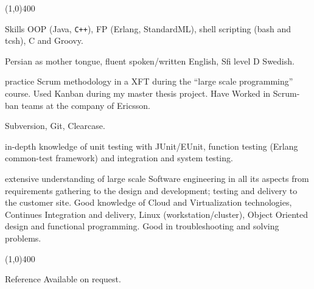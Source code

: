 \documentclass{resume}
\begin{document}
\begin{center}
\line(1,0){400}
\end{center}
\begin{category}{Skills}
\hspace{1 mm}OOP (Java, \texttt{C++}), FP (Erlang, StandardML), 
shell scripting (bash and tcsh), C and Groovy.

\hspace{1 mm}Persian as mother tongue, fluent spoken/written English,
Sfi level D Swedish.

\hspace{1 mm}practice Scrum methodology in a XFT during 
the ``large scale programming'' course. Used Kanban during my master thesis project. 
Have Worked in Scrum-ban teams at the company of Ericsson.

\hspace{1 mm}Subversion, Git, Clearcase. 

\hspace{1 mm}in-depth knowledge of unit 
testing with JUnit/EUnit, function testing (Erlang common-test framework) 
and integration and system testing.

\hspace{1 mm}extensive understanding of large scale 
Software engineering in all its aspects from requirements gathering 
to the design and development; testing and delivery to the customer site. 
Good knowledge of Cloud and Virtualization technologies, Continues Integration and delivery, 
Linux (workstation/cluster), Object Oriented design and functional programming.
Good in troubleshooting and solving problems.

\end{category}

\begin{center}
\line(1,0){400}
\end{center}


\begin{category}{Reference} 
\citemnobullet Available on request.
\end{category}
\end{document}
